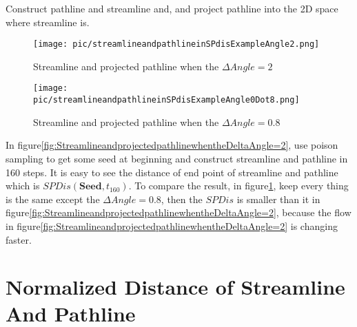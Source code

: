 \documentclass[
     11pt,         %
     a4paper,      %
     oneside,
     ]{article}
\newcommand{\vect}[1]{\boldsymbol{#1}}
\begin{document}
	Construct pathline and streamline and, and project pathline into the 2D space where streamline is.
	\begin{figure}[H]
		\centering
		\begin{minipage}{0.65\textwidth}
		\centering
		\texttt{[image: pic/streamlineandpathlineinSPdisExampleAngle2.png]}
		\caption{\tiny Streamline and projected pathline when the $\Delta Angle = 2$ }
		\label{fig:StreamlineandprojectedpathlinewhentheDeltaAngle=2}
	    \end{minipage}
	    \begin{minipage}{0.65\textwidth}
	    \centering
	    \texttt{[image: pic/streamlineandpathlineinSPdisExampleAngle0Dot8.png]}
	    \caption{\tiny Streamline and projected pathline when the $\Delta Angle = 0.8$ }
	    \label{fig:StreamlineandprojectedpathlinewhentheDeltaAngle=0.8}
	    \end{minipage}
	\end{figure} 
	In figure\ref{fig:StreamlineandprojectedpathlinewhentheDeltaAngle=2}, use poison sampling to get some seed at beginning and construct streamline and pathline in 160 steps. It is easy to see the distance of end point of streamline and pathline which is $SPDis(\vect{Seed},t_{160})$. To compare the result, in figure\ref{fig:StreamlineandprojectedpathlinewhentheDeltaAngle=0.8}, keep every thing is the same except the $\Delta Angle=0.8$, then the $SPDis$ is smaller than it in figure\ref{fig:StreamlineandprojectedpathlinewhentheDeltaAngle=2}, because the flow in figure\ref{fig:StreamlineandprojectedpathlinewhentheDeltaAngle=2} is changing faster.
	 
\section{Normalized Distance of Streamline And Pathline}
\end{document}
